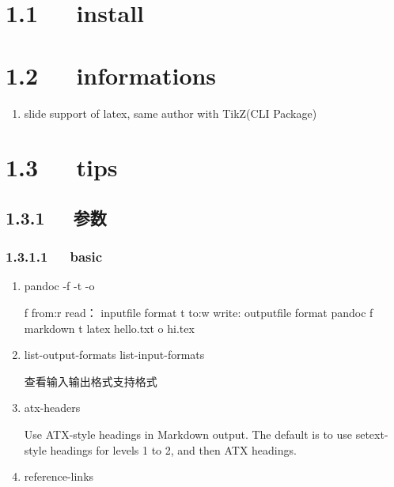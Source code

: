 \documentclass[letterpaper,12pt,english]{sphinxmanual}
\begin{document}
\section{1.1   install}
\label{\detokenize{001software/001install/pandoc:install}}

\section{1.2   informations}
\label{\detokenize{001software/001install/pandoc:informations}}\begin{enumerate}
%
\item {} 

slide support of latex, same author with TikZ(CLI Package)

\end{enumerate}


\section{1.3   tips}
\label{\detokenize{001software/001install/pandoc:tips}}

\subsection{1.3.1   参数}
\label{\detokenize{001software/001install/pandoc:id2}}

\subsubsection{1.3.1.1   basic}
\label{\detokenize{001software/001install/pandoc:basic}}\begin{enumerate}
%
\item {} 
pandoc -f -t -o

\begin{sphinxVerbatim}[commandchars=\\\{\}]
\PYGZhy{}f \PYGZhy{}\PYGZhy{}from:\PYGZhy{}r \PYGZhy{}\PYGZhy{}read： inputfile format
\PYGZhy{}t \PYGZhy{}\PYGZhy{}to:\PYGZhy{}w \PYGZhy{}\PYGZhy{}write: outputfile format
pandoc \PYGZhy{}f markdown \PYGZhy{}t latex hello.txt \PYGZhy{}o hi.tex
\end{sphinxVerbatim}

\item {} 
\textendash{}list-output-formats \textendash{}list-input-formats

查看输入输出格式支持格式

\item {} 
\textendash{}atx-headers

Use ATX-style headings in Markdown output. The default is to use
setext-style headings for levels 1 to 2, and then ATX headings.

\item {} 
\textendash{}reference-links

\end{enumerate}
\end{document}
